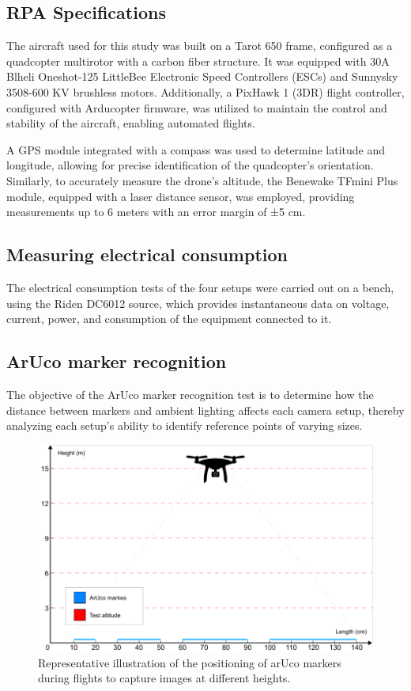\documentclass[letterpaper]{article}
\begin{document}
\subsection{RPA Specifications}

The aircraft used for this study was built on a Tarot 650 frame, configured as a quadcopter multirotor with a carbon fiber structure. It was equipped with 30A Blheli Oneshot-125 LittleBee Electronic Speed Controllers (ESCs) and Sunnysky 3508-600 KV brushless motors. Additionally, a PixHawk 1 (3DR) flight controller, configured with Arducopter firmware, was utilized to maintain the control and stability of the aircraft, enabling automated flights.

A GPS module integrated with a compass was used to determine latitude and longitude, allowing for precise identification of the quadcopter's orientation. Similarly, to accurately measure the drone's altitude, the Benewake TFmini Plus module, equipped with a laser distance sensor, was employed, providing measurements up to 6 meters with an error margin of ±5 cm.



\subsection{Measuring electrical consumption}

The electrical consumption tests of the four setups were carried out on a bench, using the Riden DC6012 source, which provides instantaneous data on voltage, current, power, and consumption of the equipment connected to it.

\subsection{ArUco marker recognition}

The objective of the ArUco marker recognition test is to determine how the distance between markers and ambient lighting affects each camera setup, thereby analyzing each setup's ability to identify reference points of varying sizes.

\begin{figure}[H]
\centering
\includegraphics[width=1\columnwidth]{sky_drone_graphic.png}
\caption{Representative illustration of the positioning of arUco markers during flights to capture images at different heights.}
\label{figure:sky_drone_graphic}
\end{figure}
\end{document}
